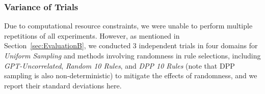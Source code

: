 \documentclass{article}
\newcommand{\mytiny}{\fontsize{8pt}{10pt}\selectfont}
\begin{document}
\begin{table}[H]
    \centering
    \mytiny
    \caption{Math \& Code fine-tuning on Llama3-8B, each using 20K selected data samples from SlimPajama.}
    \label{tab:Math_Code_MoreBaseline}
\end{table}


\subsubsection{Variance of Trials}\label{subsubsec:Appendix-EvalB-Trials}
Due to computational resource constraints, we were unable to perform multiple repetitions of all experiments. However, as mentioned in Section~\ref{sec:EvaluationB}, we conducted 3 independent trials in four domains for \textit{Uniform Sampling} and methods involving randomness in rule selections, including \textit{GPT-Uncorrelated}, \textit{Random 10 Rules}, and \textit{DPP 10 Rules} (note that DPP sampling is also non-deterministic) to mitigate the effects of randomness, and we report their standard deviations here.
\end{document}
